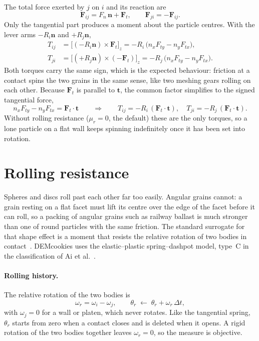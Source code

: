 The total force exerted by $j$ on $i$ and its reaction are
\begin{equation}
  \mathbf{F}_{ij} = F_{n}\,\mathbf{n} + \mathbf{F}_{t},
  \qquad
  \mathbf{F}_{ji} = -\mathbf{F}_{ij}.
  \label{eq:Fij}
\end{equation}
Only the tangential part produces a moment about the particle centres.  With the
lever arms $-R_{i}\mathbf{n}$ and $+R_{j}\mathbf{n}$,
\begin{align}
  T_{ij} &= \bigl[(-R_{i}\mathbf{n})\times\mathbf{F}_{t}\bigr]_{z}
          = -R_{i}\,\bigl(n_{x}F_{ty}-n_{y}F_{tx}\bigr),
          \label{eq:Ti}\\
  T_{ji} &= \bigl[(+R_{j}\mathbf{n})\times(-\mathbf{F}_{t})\bigr]_{z}
          = -R_{j}\,\bigl(n_{x}F_{ty}-n_{y}F_{tx}\bigr).
          \label{eq:Tj}
\end{align}
Both torques carry the same sign, which is the expected behaviour: friction at
a contact spins the two grains in the same sense, like two meshing gears rolling
on each other.  Because $\mathbf{F}_{t}$ is parallel to $\mathbf{t}$, the common
factor simplifies to the signed tangential force,
\begin{equation}
  n_{x}F_{ty}-n_{y}F_{tx} = \mathbf{F}_{t}\cdot\mathbf{t}
  \qquad\Longrightarrow\qquad
  T_{ij} = -R_{i}\,(\mathbf{F}_{t}\cdot\mathbf{t}),
  \quad
  T_{ji} = -R_{j}\,(\mathbf{F}_{t}\cdot\mathbf{t}).
\end{equation}
Without rolling resistance ($\mu_{r}=0$, the default) these are the only
torques, so a lone particle on a flat wall keeps spinning indefinitely once it
has been set into rotation.

\section{Rolling resistance}
\label{sec:rolling}

Spheres and discs roll past each other far too easily.  Angular grains cannot:
a grain resting on a flat facet must lift its centre over the edge of the facet
before it can roll, so a packing of angular grains such as railway ballast is
much stronger than one of round particles with the same friction.  The standard
surrogate for that shape effect is a moment that resists the relative rotation
of two bodies in contact~\cite{iwashita1998}.  DEMcookies uses the
elastic--plastic spring--dashpot model, type~C in the classification of Ai et
al.~\cite{ai2011}.

\paragraph{Rolling history.}  The relative rotation of the two bodies is
\begin{equation}
  \omega_{r} = \omega_{i} - \omega_{j},
  \qquad
  \theta_{r} \;\leftarrow\; \theta_{r} + \omega_{r}\,\Delta t ,
  \label{eq:theta-r}
\end{equation}
with $\omega_{j}=0$ for a wall or platen, which never rotates.  Like the
tangential spring, $\theta_{r}$ starts from zero when a contact closes and is
deleted when it opens.  A rigid rotation of the two bodies together leaves
$\omega_{r}=0$, so the measure is objective.

